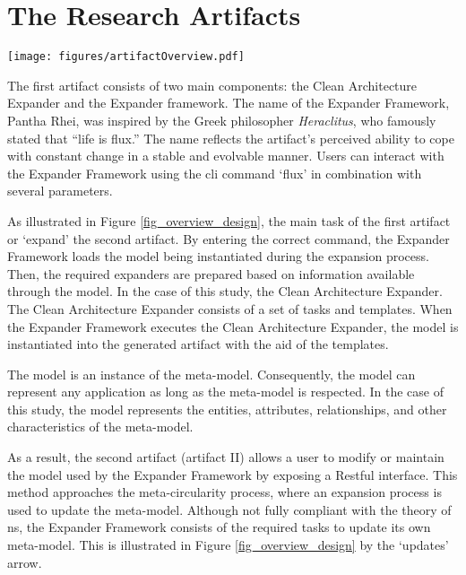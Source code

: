 \section{The Research Artifacts}

\begin{figure*}[ht!]
  \centering
  \centerline{\texttt{[image: figures/artifactOverview.pdf]}}
  \caption[Schematic overview of the artifacts]{Schematic overview of the artifacts}
  \label{fig_overview_design}
\end{figure*}

The first artifact consists of two main components: the Clean Architecture Expander and
the Expander framework. The name of the Expander Framework, Pantha Rhei, was inspired by
the Greek philosopher \emph{Heraclitus}, who famously stated that \enquote{life is flux.}
The name reflects the artifact's perceived ability to cope with constant change in a
stable and evolvable manner. Users can interact with the Expander Framework using the
\gls{cli} command \enquote*{flux} in combination with several parameters.

As illustrated in Figure \ref{fig_overview_design}, the main task of the first artifact or
\enquote*{expand} the second artifact. By entering the correct command, the Expander
Framework loads the model being instantiated during the expansion process. Then, the
required expanders are prepared based on information available through the model. In the
case of this study, the Clean Architecture Expander. The Clean Architecture Expander
consists of a set of tasks and templates. When the Expander Framework executes the Clean
Architecture Expander, the model is instantiated into the generated artifact with the aid
of the templates.

The model is an instance of the meta-model. Consequently, the model can represent any
application as long as the meta-model is respected. In the case of this study, the model
represents the entities, attributes, relationships, and other characteristics of the
meta-model.

As a result, the second artifact (artifact II) allows a user to modify or maintain the
model used by the Expander Framework by exposing a Restful interface. This method
approaches the meta-circularity process, where an expansion process is used to update the
meta-model. Although not fully compliant with the theory of \gls{ns}, the Expander
Framework consists of the required tasks to update its own meta-model. This is illustrated
in Figure \ref{fig_overview_design} by the \enquote*{updates} arrow.



